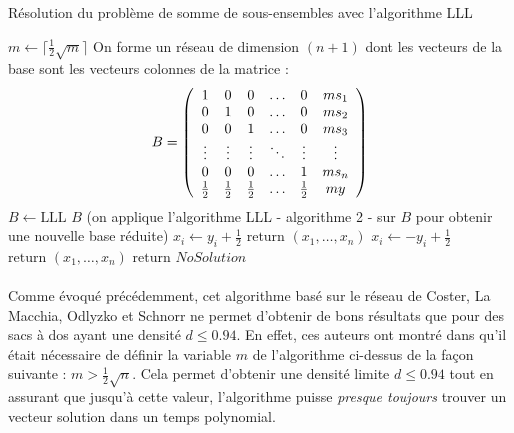 \begin{algorithm}
\caption{Résolution du problème de somme de sous-ensembles avec l'algorithme LLL}

\begin{algorithmic}[1]
	\State $m \leftarrow \lceil \frac{1}{2}\sqrt{m} \rceil $
	\State On forme un réseau de dimension $(n+1)$ dont les vecteurs de la base sont les vecteurs colonnes de la matrice :
	\[ B = \left(
  		\begin{array}{ c c c c c c }
     	1 & 0 & 0 & \ldots & 0 & ms_1 \\
     	0 & 1 & 0 & \ldots & 0 & ms_2 \\
     	0 & 0 & 1 & \ldots & 0 & ms_3 \\
     	\vdots & \vdots & \vdots & \ddots & \vdots & \vdots \\
     	0 & 0 & 0 & \ldots & 1 & ms_n \\
     	\frac{1}{2} & \frac{1}{2} & \frac{1}{2} & \ldots & \frac{1}{2} & my 
  		\end{array} \right)
		\]
	\State $B \leftarrow \text{LLL } B$ (on applique l'algorithme LLL - algorithme 2 - sur $B$ pour obtenir une nouvelle base réduite)
				\State $x_i \leftarrow y_i + \frac{1}{2}$
					\State $\text{return } (x_1, \ldots, x_n)$
				\EndIf
			\EndFor
				\State $x_i \leftarrow - y_i + \frac{1}{2}$
					\State $\text{return } (x_1, \ldots, x_n)$
				\EndIf
			\EndFor
		\EndIf
	\EndFor
	\State $\text{return } NoSolution$
\end{algorithmic}
\end{algorithm}


\paragraph{} Comme évoqué précédemment, cet algorithme basé sur le réseau de Coster, La Macchia, Odlyzko et Schnorr ne permet d'obtenir de bons résultats que pour des sacs à dos ayant une densité $d \leq 0.94$. En effet, ces auteurs ont montré dans \cite{COSTER} qu'il était nécessaire de définir la variable $m$ de l'algorithme ci-dessus de la façon suivante : $m>\frac{1}{2}\sqrt{n}$. Cela permet d'obtenir une densité limite $d\leq 0.94$ tout en assurant que jusqu'à cette valeur, l'algorithme puisse \textit{presque toujours} trouver un vecteur solution dans un temps polynomial.

